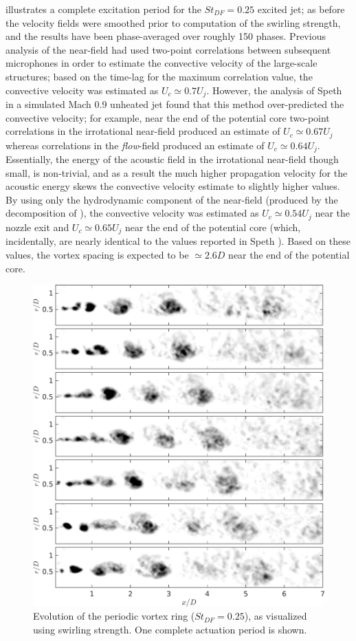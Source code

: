  illustrates a complete excitation period for the $St_{DF} = 0.25$ excited jet; as before the velocity fields were smoothed prior to computation of the swirling strength, and the results have been phase-averaged over roughly 150 phases.
Previous analysis of the near-field had used two-point correlations between subsequent microphones in order to estimate the convective velocity of the large-scale structures; based on the time-lag for the maximum correlation value, the convective velocity was estimated as $U_c \simeq 0.7 U_j$.
However, the analysis of Speth \citep{Speth2015} in a simulated Mach 0.9 unheated jet found that this method over-predicted the convective velocity; for example, near the end of the potential core two-point correlations in the irrotational near-field produced an estimate of $U_c \simeq 0.67 U_j$ whereas correlations in the \textit{flow}-field produced an estimate of $U_c \simeq 0.64 U_j$.
Essentially, the energy of the acoustic field in the irrotational near-field though small, is non-trivial, and as a result the much higher propagation velocity for the acoustic energy skews the convective velocity estimate to slightly higher values.
By using only the hydrodynamic component of the near-field (produced by the decomposition of ), the convective velocity was estimated as $U_c \simeq 0.54 U_j$ near the nozzle exit and $U_c \simeq 0.65 U_j$ near the end of the potential core (which, incidentally, are nearly identical to the values reported in Speth \citep{Speth2015}).
Based on these values, the vortex spacing is expected to be $\simeq 2.6D$ near the end of the potential core.
\begin{figure}
	\centering
	\includegraphics[width=5in]{Figures/ch4_St025_lambda.png}
	\caption{Evolution of the periodic vortex ring ($St_{DF}=0.25$), as visualized using swirling strength. One complete actuation period is shown.}
	\label{fig:ch4_period_structure_disintegration}
\end{figure}


